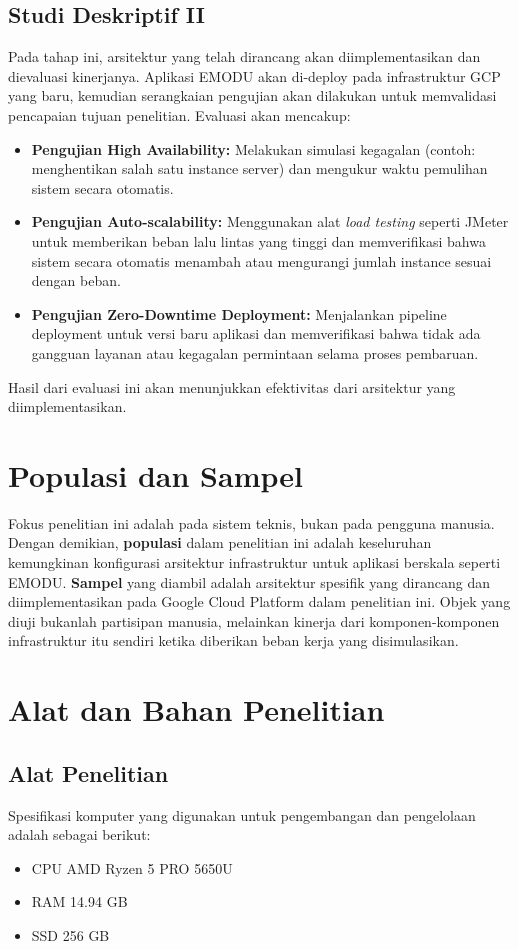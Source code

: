 \subsection{Studi Deskriptif II}
Pada tahap ini, arsitektur yang telah dirancang akan diimplementasikan dan dievaluasi kinerjanya.
Aplikasi EMODU akan di-deploy pada infrastruktur GCP yang baru, kemudian serangkaian pengujian akan dilakukan untuk memvalidasi pencapaian tujuan penelitian.
Evaluasi akan mencakup:
\begin{itemize}
    \item \textbf{Pengujian High Availability:} Melakukan simulasi kegagalan (contoh: menghentikan salah satu instance server) dan mengukur waktu pemulihan sistem secara otomatis.
    \item \textbf{Pengujian Auto-scalability:} Menggunakan alat \textit{load testing} seperti JMeter untuk memberikan beban lalu lintas yang tinggi dan memverifikasi bahwa sistem secara otomatis menambah atau mengurangi jumlah instance sesuai dengan beban.
    \item \textbf{Pengujian Zero-Downtime Deployment:} Menjalankan pipeline deployment untuk versi baru aplikasi dan memverifikasi bahwa tidak ada gangguan layanan atau kegagalan permintaan selama proses pembaruan.
\end{itemize}
Hasil dari evaluasi ini akan menunjukkan efektivitas dari arsitektur yang diimplementasikan.

\section{Populasi dan Sampel}
Fokus penelitian ini adalah pada sistem teknis, bukan pada pengguna manusia.
Dengan demikian, \textbf{populasi} dalam penelitian ini adalah keseluruhan kemungkinan konfigurasi arsitektur infrastruktur untuk aplikasi berskala seperti EMODU.
\textbf{Sampel} yang diambil adalah arsitektur spesifik yang dirancang dan diimplementasikan pada Google Cloud Platform dalam penelitian ini.
Objek yang diuji bukanlah partisipan manusia, melainkan kinerja dari komponen-komponen infrastruktur itu sendiri ketika diberikan beban kerja yang disimulasikan.

\section{Alat dan Bahan Penelitian}
\subsection{Alat Penelitian}
Spesifikasi komputer yang digunakan untuk pengembangan dan pengelolaan adalah sebagai berikut:
\begin{itemize}
  \item CPU AMD Ryzen 5 PRO 5650U
  \item RAM 14.94 GB
  \item SSD 256 GB
\end{itemize}

